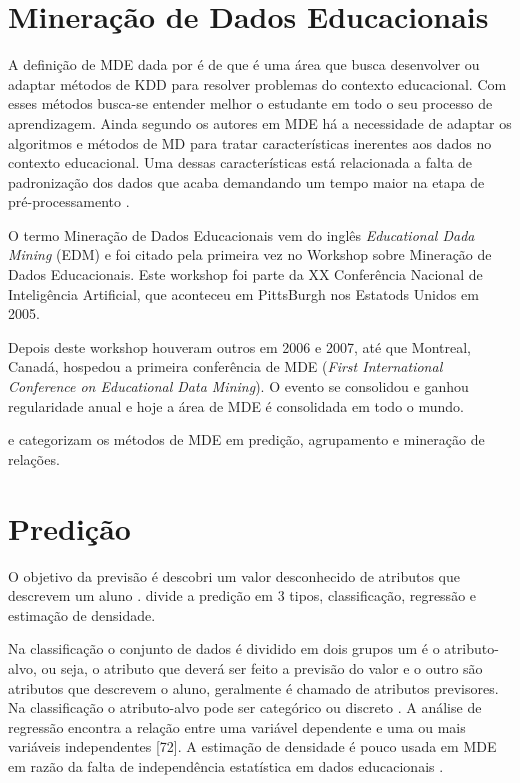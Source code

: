 \documentclass[diss,capa]{texufpel}
\begin{document}
\section{Mineração de Dados Educacionais}

A definição de MDE dada por \citet{Costa2012} é de que é uma área que busca desenvolver ou adaptar métodos de KDD para resolver problemas do contexto educacional.
Com esses métodos busca-se entender melhor o estudante em todo o seu processo de aprendizagem.
Ainda segundo os autores em MDE há a necessidade de adaptar os algoritmos e métodos de MD para tratar características inerentes aos dados no contexto educacional. 
Uma dessas características está relacionada a falta de padronização dos dados que acaba demandando um tempo maior na etapa de pré-processamento \cite{baker2011mineraccao}.

O termo Mineração de Dados Educacionais vem do inglês \textit{Educational Dada Mining} (EDM) e foi citado pela primeira vez no Workshop sobre Mineração de Dados Educacionais.
Este workshop foi parte da XX Conferência Nacional de Inteligência Artificial, que aconteceu em PittsBurgh nos Estatods Unidos em 2005.

Depois deste workshop houveram outros em 2006 e 2007, até que Montreal, Canadá, hospedou a primeira conferência de MDE (\textit{First International Conference on Educational Data Mining}).
O evento se consolidou e ganhou regularidade anual e hoje a área de MDE é consolidada em todo o mundo.

\citet{baker2011mineraccao} e \citet{Romero2013} categorizam os métodos de MDE em predição, agrupamento e mineração de relações.

\section{Predição}

O objetivo da previsão é descobri um valor desconhecido de atributos que descrevem um aluno \cite{Romero2013}. \citet{baker2010data} divide a predição em 3 tipos, classificação, regressão e estimação de densidade.

Na classificação o conjunto de dados é dividido em dois grupos um é o atributo-alvo, ou seja, o atributo que deverá ser feito a previsão do valor e o outro são atributos que descrevem o aluno, geralmente é chamado de atributos previsores. Na classificação o atributo-alvo pode ser categórico ou discreto \cite{goldschmidt2015data}.
A análise de regressão encontra a relação entre uma variável dependente e uma ou mais variáveis independentes [72].
A estimação de densidade é pouco usada em MDE em razão da falta de independência estatística em dados educacionais \cite{baker2011mineraccao}.
\end{document}
